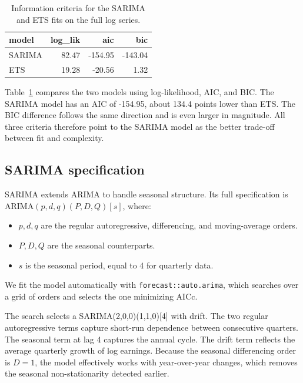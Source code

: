 \documentclass[
  english,
  a4paper,
]{article}
\providecommand{\tightlist}{%
  \setlength{\itemsep}{0pt}\setlength{\parskip}{0pt}}
\begin{document}
{

\begin{longtable}[]{@{}lrrr@{}}

\caption{\label{tbl-model-comparison}Information criteria for the SARIMA
and ETS fits on the full log series.}

\tabularnewline

\toprule\noalign{}
model & log\_lik & aic & bic \\
\midrule\noalign{}
\endhead
\bottomrule\noalign{}
\endlastfoot
SARIMA & 82.47 & -154.95 & -143.04 \\
ETS & 19.28 & -20.56 & 1.32 \\

\end{longtable}

}

Table~\ref{tbl-model-comparison} compares the two models using
log-likelihood, AIC, and BIC. The SARIMA model has an AIC of -154.95,
about 134.4 points lower than ETS. The BIC difference follows the same
direction and is even larger in magnitude. All three criteria therefore
point to the SARIMA model as the better trade-off between fit and
complexity.

\subsection{SARIMA specification}\label{sarima-specification}

SARIMA extends ARIMA to handle seasonal structure. Its full
specification is \(\text{ARIMA}(p, d, q)(P, D, Q)[s]\), where:

\begin{itemize}
\tightlist
\item
  \(p, d, q\) are the regular autoregressive, differencing, and
  moving-average orders.
\item
  \(P, D, Q\) are the seasonal counterparts.
\item
  \(s\) is the seasonal period, equal to 4 for quarterly data.
\end{itemize}

We fit the model automatically with \texttt{forecast::auto.arima}, which
searches over a grid of orders and selects the one minimizing AICc.

The search selects a SARIMA(2,0,0)(1,1,0){[}4{]} with drift. The two
regular autoregressive terms capture short-run dependence between
consecutive quarters. The seasonal term at lag 4 captures the annual
cycle. The drift term reflects the average quarterly growth of log
earnings. Because the seasonal differencing order is \(D = 1\), the
model effectively works with year-over-year changes, which removes the
seasonal non-stationarity detected earlier.
\end{document}
